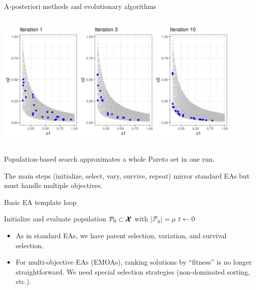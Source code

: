 \documentclass[11pt,compress,t,notes=noshow,xcolor=table]{beamer}
\newcommand{\XX}{\pcs}     %
\begin{document}
\begin{vbframe}{A-posteriori methods and evolutionary algorithms}
\begin{columns}
\begin{column}{0.7\textwidth}
\begin{center}
\includegraphics[width=0.9\textwidth]{slides/11-multicrit/figure_man/NSGA2_steps.png}
\end{center}
\end{column}
\end{columns}

\begin{itemize}{\small
\item Population-based search approximates a whole Pareto set in one run.
\item The main steps (initialize, select, vary, survive, repeat) mirror standard EAs but must handle multiple objectives.}
\end{itemize}

\end{vbframe}

\begin{vbframe}{Basic EA template loop}

\begin{algorithm2e}[H]
\SetAlgoLined         %
\caption{Basic EA template loop}


Initialize and evaluate population $\mathcal{P}_0 \subset \XX$ with $|\mathcal{P}_0| = \mu$\;
$t \gets 0$\;

\end{algorithm2e}


\bigskip
\begin{itemize}
  \item As in standard EAs, we have parent selection, variation, and survival selection.
  \item For multi-objective EAs (EMOAs), ranking solutions by “fitness” is no longer straightforward. We need special selection strategies (non-dominated sorting, etc.).
\end{itemize}

\end{vbframe}
\end{document}
